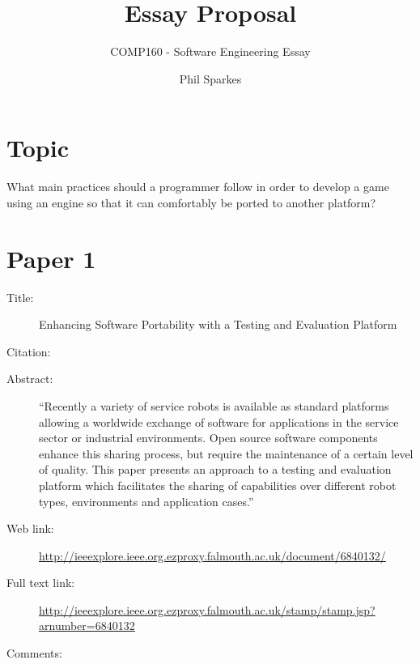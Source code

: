 \documentclass{scrartcl}
\title{Essay Proposal}
\subtitle{COMP160 - Software Engineering Essay}
\author{Phil Sparkes}
\begin{document}
\maketitle

\section*{Topic}

What main practices should a programmer follow in order to develop a game using an engine so that it can comfortably be ported to another platform?


\section*{Paper 1}
\begin{description}
\item[Title:] Enhancing Software Portability with a Testing and Evaluation Platform
\item[Citation:] \cite{Weisshardt}
\item[Abstract:] ``Recently a variety of service robots is available as standard platforms allowing a worldwide exchange of software for applications in the service sector or industrial environments. Open source software components enhance this sharing process, but require the maintenance of a certain level of quality. This paper presents an approach to a testing and evaluation platform which facilitates the sharing of capabilities over different robot types, environments and application cases.''
\item[Web link:] \url{http://ieeexplore.ieee.org.ezproxy.falmouth.ac.uk/document/6840132/}
\item[Full text link:] \url{http://ieeexplore.ieee.org.ezproxy.falmouth.ac.uk/stamp/stamp.jsp?arnumber=6840132}
\item[Comments:] 
\end{description}
\end{document}
